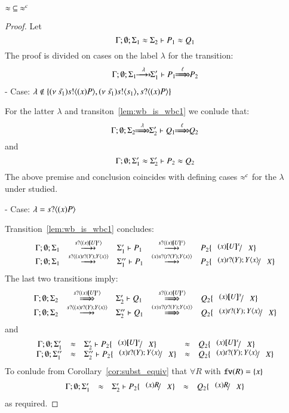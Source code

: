 
\begin{lemma}\rm
	\label{lem:wb_is_wbc}
	$\approx\ \subseteq\ \approx^{c}$
\end{lemma}

\begin{proof}
	Let
	\[
		\Gamma; \emptyset; \Sigma_1 \approx \Sigma_2 \vdash P_1 \approx Q_1
	\]
	The proof is divided on cases on the label $\lambda$ for the transition:
%
	\begin{eqnarray}
		\Gamma; \es; \Sigma_1 \hby{\lambda} \Sigma_1' \proves P_1 \Hby{\ell} P_2 \label{lem:wb_is_wbc1}
	\end{eqnarray}
%
	\noi - Case: $\lambda \notin \{ (\nu\ \tilde{s_1}) s ! \langle (x) P \rangle,  (\nu\ \tilde{s_1}) s ! \langle s_1 \rangle, s ? \langle (x) P \rangle \}$

	\noi For the latter $\lambda$ and transiton~\ref{lem:wb_is_wbc1} we conlude that:	
%
	\[
		\Gamma; \es; \Sigma_2 \Hby{\lambda} \Sigma_2' \proves Q_1 \Hby{\ell} Q_2
	\]
%
	\noi and
%
	\[
		\Gamma; \emptyset; \Sigma_1' \approx \Sigma_2' \vdash P_2 \approx Q_2
	\]
%
	The above premise and conclusion coincides with defining cases $\approx^{c}$ for
	the $\lambda$ under studied.

	\noi - Case: $\lambda = s ? \langle (x) P \rangle$

	\noi Transition~\ref{lem:wb_is_wbc1} concludes:
%
\[
	\begin{array}{rclcl}
		\Gamma; \es; \Sigma_1 &\hby{\bactinp{s}{(x) \map{U}^x}}& \Sigma_1' \proves P_1 &\hby{\bactinp{s}{(x) \map{U}^x}}& P_2 \subst{(x) \map{U}^x}{X}\\
		\Gamma; \es; \Sigma_1 &\hby{\bactinp{s}{(x) \binp{t}{Y} \appl{Y}{x}}}& \Sigma_1'' \proves P_1 &\hby{(x) \bactinp{s}{ \binp{t}{Y} \appl{Y}{x}}}& P_2 \subst{(x) \binp{t}{Y} \appl{Y}{x}}{X}
	\end{array}
\]
%
	\noi The last two transitions imply:
%
\[
	\begin{array}{rclcl}
		\Gamma; \es; \Sigma_2 &\Hby{\bactinp{s}{(x) \map{U}^x}}& \Sigma_2' \proves Q_1 &\Hby{\bactinp{s}{(x) \map{U}^x}}& Q_2 \subst{(x) \map{U}^x}{X}\\
		\Gamma; \es; \Sigma_2 &\hby{\bactinp{s}{(x) \binp{t}{Y} \appl{Y}{x}}}& \Sigma_2'' \proves Q_1 &\Hby{(x) \bactinp{s}{ \binp{t}{Y} \appl{Y}{x}}}& Q_2 \subst{(x) \binp{t}{Y} \appl{Y}{x}}{X}
	\end{array}
\]
%
	\noi and
\[
	\begin{array}{rclcl}
		\Gamma; \es; \Sigma_1' &\wb& \Sigma_2' \proves P_2 \subst{(x) \map{U}^x}{X} &\wb& Q_2 \subst{(x) \map{U}^x}{X}\\
		\Gamma; \es; \Sigma_1'' &\wb& \Sigma_2'' \proves P_2 \subst{(x) \binp{t}{Y} \appl{Y}{x}}{X} &\wb& Q_2 \subst{(x) \binp{t}{Y} \appl{Y}{x}}{X}
	\end{array}
\]
%
	\noi To conlude from Corollary~\ref{cor:subst_equiv} that
	$\forall R$ with $\mathtt{fv}(R) = \{x\}$
\[
	\begin{array}{rclcl}
		\Gamma; \es; \Sigma_1' &\wb& \Sigma_2' \proves P_2 \subst{(x) R}{X} &\wb& Q_2 \subst{(x) R}{X}\\
	\end{array}
\]
	\noi as required.


\end{proof}
